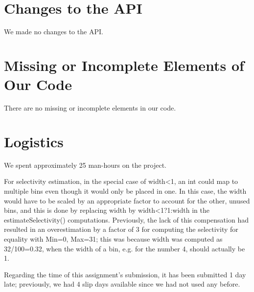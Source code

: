 \documentclass[paper=a4, fontsize=11pt]{scrartcl} %
\numberwithin{equation}{section} %
\numberwithin{figure}{section} %
\numberwithin{table}{section} %
\begin{document}
\section{Changes to the API}

We made no changes to the API.




\section{Missing or Incomplete Elements of Our Code}

There are no missing or incomplete elements in our code.




\section{Logistics}

We spent approximately 25 man-hours on the project.


For selectivity estimation, in the special case of width<1, an int could map to multiple bins even though it would only be placed in one. In this case, the width would have to be scaled by an appropriate factor to account for the other, unused bins, and this is done by replacing width by width<1?1:width in the estimateSelectivity() computations. Previously, the lack of this compensation had resulted in an overestimation by a factor of 3 for computing the selectivity for equality with Min=0, Max=31; this was because width was computed as 32/100=0.32, when the width of a bin, e.g. for the number 4, should actually be 1.

Regarding the time of this assignment's submission, it has been submitted 1 day late; previously, we had 4 slip days available since we had not used any before.
\end{document}

